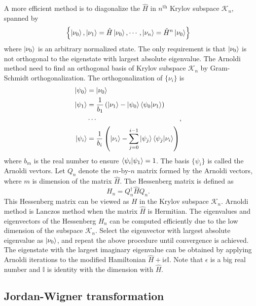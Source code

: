 \documentclass[longbibliography, aps, prx, amsmath, amssymb, amsfonts, twocolumn,superscriptaddress, footinbib]{revtex4-1}
\begin{document}
	A more efficient method is to diagonalize the $\hat{H}$ in $n^{\text{th}}$ Krylov subspace $\mathcal{K}_n$, spanned by
	\begin{equation}
		\left\{ \ket{\nu_0}, \ket{\nu_1}=\hat{H}\ket{\nu_0},\cdots,\ket{\nu_n}=\hat{H}^n\ket{\nu_0}\right\}
	\end{equation}
	where $\ket{\nu_0}$ is an arbitrary normalized state. The only requirement is that $\ket{\nu_0}$ is not orthogonal to the eigenstate with largest absolute eigenvalue. 
	The Arnoldi method need to find an orthogonal basis of Krylov subspace $\mathcal{K}_n$ by Gram-Schmidt orthogonalization. %
	The orthogonalization of $\{\nu_i\}$ is 
	\begin{equation}
		\begin{split}
			\ket{\psi_0} &= \ket{\nu_0}\\
			\ket{\psi_1} &= \frac{1}{b_1}\left(\ket{\nu_1} - \ket{\psi_0} \bra{\psi_0} \ket{\nu_1}\right)\\
			&\cdots\\
			\ket{\psi_i} &= \frac{1}{b_i}\left(\ket{\nu_i} - \sum_{j=0}^{i-1} \ket{\psi_j} \bra{\psi_j} \ket{\nu_i}\right)
		\end{split},			
	\end{equation}
	where $b_m$ is the real number to ensure $\bra{\psi_i}\ket{\psi_1}=1$. The basis $\{ \psi_i \}$ is called the Arnoldi vevtors. Let $Q_n$ denote the $m$-by-$n$ matrix formed by the Arnoldi vectors, where $m$ is dimension of the matrix $\hat{H}$. The Hessenberg matrix is defined as 
	\begin{equation}
		H_n = Q_n^{\dagger} \hat{H} Q_n.
	\end{equation}
	This Hessenberg matrix can be viewed as $\hat{H}$ in the Krylov subspace $\mathcal{K}_n$. 
	Arnoldi method is Lanczos method when the matrix $\hat{H}$ is Hermitian.
	The eigenvalues and eigenvectors of the Hessenberg $H_n$ can be computed efficiently due to the low dimension of the subspace $\mathcal{K}_n$. Select the eigenvector with largest absolute eigenvalue as $\ket{\nu_0}$, and repeat the above procedure until convergence is achieved. The eigenstate with the largest imaginary eigenvalue can be obtained by applying Arnoldi iterations to the modified Hamiltonian $\hat{H} + \mathrm{i} \epsilon \mathbb{I}$. Note that $\epsilon$ is a big real number and $\mathbb{I}$ is identity with the dimension with $\hat{H}$.

	\subsection{Jordan-Wigner transformation}
\end{document}
